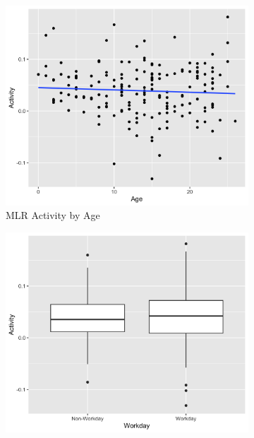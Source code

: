 \documentclass[12pt,twoside,leqno,fleqn,letterpaper]{article}
\theoremstyle{definition}
\theoremstyle{definition}
\begin{document}
        \begin{figure} 
            \centering
            \begin{subfigure}[b]{0.32\textwidth}
            \centering
            \includegraphics[width=\textwidth]{pics/mlr act by age.png}
            \caption[]%
            {{\small MLR Activity by Age}}
            \label{fig: act v age}
            \end{subfigure}
            \hfill
            \begin{subfigure}[b]{0.32\textwidth}
            \centering
            \includegraphics[width=\textwidth]{pics/mlr act by day.png}

\end{subfigure}
\end{figure}
\end{document}
